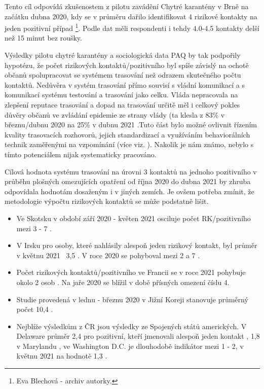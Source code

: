 Tento cíl odpovídá zkušenostem z pilotu zavádění Chytré karantény v Brně na začátku dubna 2020, kdy se v průměru dařilo identifikovat 4 rizikové kontakty na jeden pozitivní případ \footnote{Eva Blechová - archiv autorky.}. Podle dat \cite{tr_PAQ01} měli respondenti i tehdy 4.0-4.5 kontakty delší než 15 minut bez roušky.

Výsledky pilotu chytré karantény a sociologická data PAQ by tak podpořily hypotézu, že počet rizikových kontaktů/pozitivního byl spíše závislý na ochotě občanů spolupracovat se systémem trasování než odrazem skutečného počtu kontaktů. Nedůvěra v systém trasování přímo souvisí s vládní komunikací a s komunikací systému testování a trasování jako celku. Vláda nepracovala na zlepšení reputace trasování \cite{tr_bisop05} a dopad na trasování určitě měl i celkový pokles důvěry občanů ve zvládání epidemie ze strany vlády (ta klesla z 83\% v březnu/dubnu 2020 na 25\% v dubnu 2021 \cite{tr_STEM}.Tuto část bylo možné ovlivnit řízením kvality trasovacích rozhovorů, jejich standardizací a využíváním behaviorálních technik zaměřenými na vzpomínání (více viz. \cite{tr_bisop06}). Nakolik je nám známo, nebylo s tímto potenciálem nijak systematicky pracováno.

Cílová hodnota systému trasování na úrovni 3 kontaktů na jednoho pozitivního v průběhu plošných omezujících opatření od října 2020 do dubna 2021 by zhruba odpovídala hodnotám dosaženým i v jiných zemích. Je ovšem potřeba zmínit, že metodologie výpočtu rizikových kontaktů se může podstatně lišit. 
\begin{itemize}
\item Ve Skotsku v období září 2020 - květen 2021 osciluje počet RK/pozitivního mezi 3 - 7 \cite{tr_scotland01}.
\item V Irsku pro osoby, které nahlásily alespoň jeden rizikový kontakt, byl průměr v květnu 2021 ~3,5 \cite{tr_irland}. V roce 2020 se pohyboval mezi 2 a 7 \cite{tr_mcaloon_numbers_2021}.
\item Počet rizikových kontaktů/pozitivního ve Francii se v roce 2021 pohybuje okolo 2 osob \cite{tr_sante01}. Na jaře 2020 se blížil v době přísných omezení číslu 4.
\item Studie provedená v lednu - březnu 2020 v Jižní Koreji stanovuje průměrný počet 10,4 \cite{tr_park}.
\item Nejblíže výsledkům z ČR jsou výsledky ze Spojených států amerických. V Delaware průměr 2,4 pro pozitivní, kteří jmenovali alespoň jeden kontakt \cite{tr_Delaware}, 1,8 v Marylandu \cite{tr_maryland01}, ve Washington D.C. je dlouhodobě indikátor mezi 1 - 2, v květnu 2021 na hodnotě 1,3 \cite{tr_DC}.
\end{itemize}

